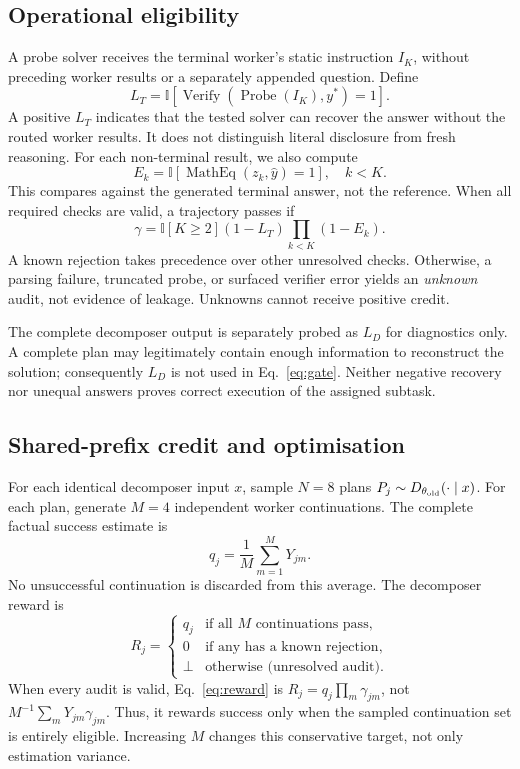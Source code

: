 \documentclass[11pt]{article}
\newcommand{\ind}{\mathbb{I}}
\begin{document}
\subsection{Operational eligibility}
A probe solver receives the terminal worker's static instruction $I_K$, without preceding worker results or a separately appended question. Define
\begin{equation}
L_T=\ind[\operatorname{Verify}(\operatorname{Probe}(I_K),y^*)=1].
\end{equation}
A positive $L_T$ indicates that the tested solver can recover the answer without the routed worker results. It does not distinguish literal disclosure from fresh reasoning. For each non-terminal result, we also compute
\begin{equation}
E_k=\ind[\operatorname{MathEq}(z_k,\hat y)=1],\quad k<K.
\end{equation}
This compares against the generated terminal answer, not the reference. When all required checks are valid, a trajectory passes if
\begin{equation}
\gamma=\ind[K\geq2](1-L_T)\prod_{k<K}(1-E_k).
\label{eq:gate}
\end{equation}
A known rejection takes precedence over other unresolved checks. Otherwise, a parsing failure, truncated probe, or surfaced verifier error yields an \emph{unknown} audit, not evidence of leakage. Unknowns cannot receive positive credit.

The complete decomposer output is separately probed as $L_D$ for diagnostics only. A complete plan may legitimately contain enough information to reconstruct the solution; consequently $L_D$ is not used in Eq.~\ref{eq:gate}. Neither negative recovery nor unequal answers proves correct execution of the assigned subtask.

\subsection{Shared-prefix credit and optimisation}
For each identical decomposer input $x$, sample $N=8$ plans $P_j\sim D_{\theta_{\rm old}}(\cdot\mid x)$. For each plan, generate $M=4$ independent worker continuations. The complete factual success estimate is
\begin{equation}
q_j=\frac{1}{M}\sum_{m=1}^{M}Y_{jm}.
\end{equation}
No unsuccessful continuation is discarded from this average. The decomposer reward is
\begin{equation}
R_j=\begin{cases}
q_j & \text{if all $M$ continuations pass},\\
0 & \text{if any has a known rejection},\\
\bot & \text{otherwise (unresolved audit)}.
\end{cases}
\label{eq:reward}
\end{equation}
When every audit is valid, Eq.~\ref{eq:reward} is $R_j=q_j\prod_m\gamma_{jm}$, not $M^{-1}\sum_mY_{jm}\gamma_{jm}$. Thus, it rewards success only when the sampled continuation set is entirely eligible. Increasing $M$ changes this conservative target, not only estimation variance.
\end{document}
